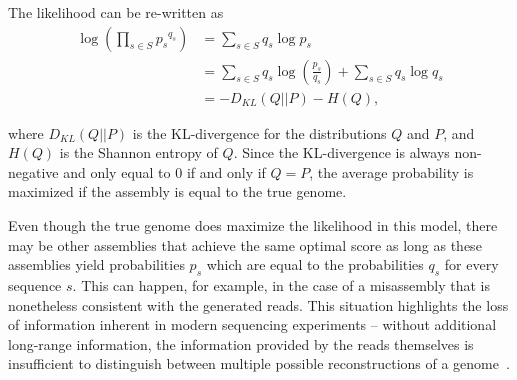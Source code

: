 

The likelihood can be re-written as
\begin{align*}
\log (\prod_{s \in S} {p_s}^{q_s}) & = \sum_{s \in S} q_s \log p_s \\
& = \sum_{s \in S} q_s \log (\frac{p_s}{q_s}) + \sum_{s \in S} q_s \log q_s \\
& = - D_{KL}(Q||P) - H(Q),
\end{align*}


\noindent where $D_{KL}(Q||P)$ is the KL-divergence for the distributions $Q$ and
$P$, and $H(Q)$ is the Shannon entropy of $Q$.  Since the
KL-divergence is always non-negative and only equal to 0 if and only if $Q = P$,
the average probability is maximized if the assembly is equal to the
true genome.

Even though the true genome does maximize the likelihood in this
model, there may be other assemblies that achieve the same optimal
score as long as these assemblies yield probabilities $p_s$ which are
equal to the probabilities $q_s$ for every sequence $s$.  This can happen, for example,
in the case of a misassembly that is nonetheless consistent with the
generated reads.  This situation highlights the loss of information
inherent in modern sequencing experiments -- without additional
long-range information, the information provided by the reads
themselves is insufficient to distinguish between multiple possible
reconstructions of a genome~\cite{kingsford2010assembly}.


